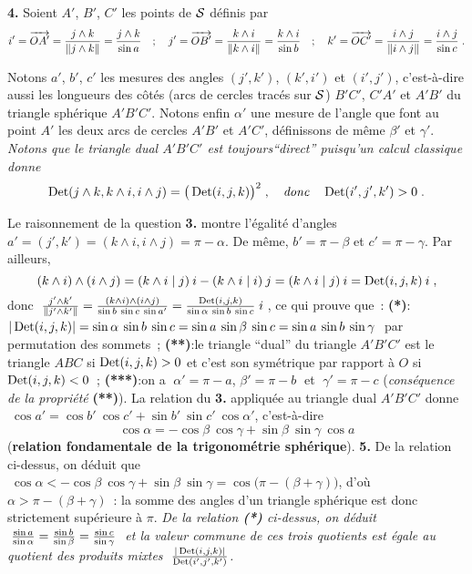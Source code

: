 \documentclass{article}
\begin{document}
\msk
{\bf 4.} Soient $A'$, $B'$, $C'$ les points de ${\cal S}$ d\'efinis par\vv
$$i'=\vect{OA'}={j\wedge k\s\|j\wedge k\|}={j\wedge k\s\sin a}\quad;\quad
j'=\vect{OB'}={k\wedge i\s\|k\wedge i\|}={k\wedge i\s\sin b}\quad;\quad
k'=\vect{OC'}={i\wedge j\s\|i\wedge j\|}={i\wedge j\s\sin c}\;.$$\par
Notons $a'$, $b'$, $c'$ les mesures des angles $(j',k')$, $(k',i')$ et $(i',j')$, c'est-\`a-dire aussi les longueurs des c\^ot\'es (arcs de cercles trac\'es sur ${\cal S}$) $B'C'$, $C'A'$ et $A'B'$ du triangle sph\'erique $A'B'C'$.\ssk
Notons enfin $\alpha'$ une mesure de l'angle que font au point $A'$ les deux arcs de cercles $A'B'$ et $A'C'$, d\'efinissons de m\^eme $\beta'$ et $\gamma'$.\msk
{\it Notons que le triangle dual $A'B'C'$ est toujours``direct'' puisqu'un calcul classique donne}\vv
$$\mathop{\rm Det}\nolimits(j\wedge k,k\wedge i,i\wedge j)=\big(\mathop{\rm Det}\nolimits(i,j,k)\big)^2\;,\quad{\it donc}\quad\mathop{\rm Det}\nolimits(i',j',k')>0\;.$$
\par
Le raisonnement de la question {\bf 3.} montre l'\'egalit\'e d'angles $a'=(j',k')=(k\wedge i,i\wedge j)=\pi-\alpha$. De m\^eme, $b'=\pi-\beta$ et $c'=\pi-\gamma$.\ssk
Par ailleurs,\vv
$$(k\wedge i)\wedge(i\wedge j) = (k\wedge i\;|\;j)\>i-(k\wedge i\;|\;i)\>j=(k\wedge i\;|\;j)\>i=\mathop{\rm Det}\nolimits(i,j,k)\>i\;,$$
donc $\;{j'\wedge k'\over\|j'\wedge k'\|}={(k\wedge i)\wedge(i\wedge j)\over\sin b\>\sin c\>\sin a'}={\mathop{\rm Det}\nolimits(i,j,k)\over\sin\alpha\>\sin b\>\sin c}\;i\;$, ce qui prouve que~:\msk\sect
{\bf (*)}\quad:\quad $|\mathop{\rm Det}\nolimits(i,j,k)|=\sin\alpha\>\sin b\>\sin c=\sin a\>\sin\beta\>\sin c=\sin a\>\sin b\>\sin\gamma\;$ par permutation des sommets~;\ssk\sect
{\bf (**)}\quad :\quad le triangle ``dual'' du triangle $A'B'C'$ est le triangle $ABC$ si $\mathop{\rm Det}\nolimits(i,j,k)>0$
et c'est son sym\'etrique par rapport \`a $O$ si $\mathop{\rm Det}\nolimits(i,j,k)<0$~;\ssk\sect
{\bf (***)}\quad :\quad on a $\;\alpha'=\pi-a$, $\beta'=\pi-b\;$ et $\;\gamma'=\pi-c$ ({\it cons\'equence de la propri\'et\'e} {\bf (**)}).\msk
La relation du {\bf 3.} appliqu\'ee au triangle dual $A'B'C'$ donne $\;\cos a'=\cos b'\>\cos c'+\sin b'\>\sin c'\>\cos\alpha'$, c'est-\`a-dire\vvvv
$$\cos\alpha=-\cos\beta\>\cos\gamma+\sin\beta\>\sin\gamma\>\cos a$$ 
({\bf relation fondamentale de la trigonom\'etrie sph\'erique}).
\msk
{\bf 5.} De la relation ci-dessus, on d\'eduit que $\;\cos\alpha<-\cos\beta\>\cos\gamma+\sin\beta\>\sin\gamma=\cos\big(\pi-(\beta+\gamma)\big)$, d'o\`u $\alpha>\pi-(\beta+\gamma)$~: la somme des angles d'un triangle sph\'erique est donc strictement sup\'erieure \`a $\pi$.
\msk
{\it De la relation {\bf (*)} ci-dessus, on d\'eduit $\;{\sin a\over\sin\alpha}={\sin b\over\sin\beta}={\sin c\over\sin\gamma}\;$ et la valeur commune de ces trois quotients est \'egale au quotient des produits mixtes $\;{|\mathop{\rm Det}\nolimits(i,j,k)|\over\mathop{\rm Det}\nolimits(i',j',k')}$.}
\end{document}
